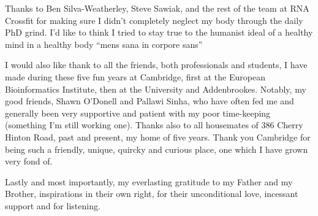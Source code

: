 \begin{acknowledgements}
 Thanks to Ben Silva-Weatherley, Steve Sawiak, and the rest of the team at RNA Crossfit for making
 sure I didn't completely neglect my body through the daily PhD grind.
 I'd like to think I tried to stay true to the humanist ideal of a healthy mind in a healthy body ``mens sana in corpore sans''

 I would also like thank to all the friends, both professionals and students,
 I have made during these five fun years at Cambridge,
 first at the European Bioinformatics Institute, then at the University and Addenbrookes.
 Notably, my good friends, Shawn O'Donell and Pallawi Sinha, who have often fed me and generally been very supportive and patient
 with my poor time-keeping (something I'm still working one).
 Thanks also to all housemates of 386 Cherry Hinton Road, past and present, my home of five years.
 Thank you Cambridge for being such a friendly, unique, quircky and curious place, one which I have grown very fond of.

 Lastly and most importantly, my everlasting gratitude to my Father and my Brother, inspirations in their own right, for their unconditional love, incessant support and for listening.

\end{acknowledgements}
